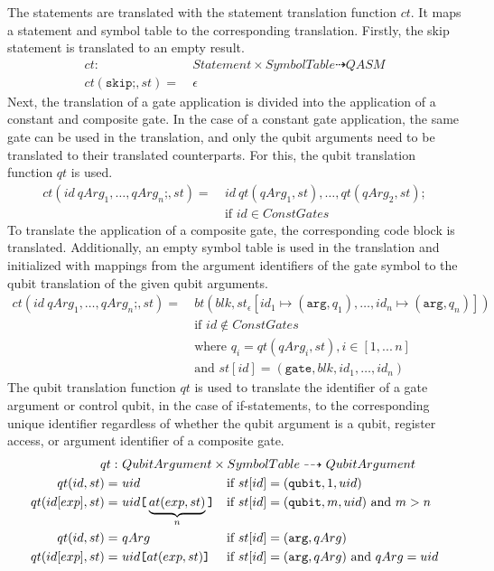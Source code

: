 The statements are translated with the statement translation function $ct$. It maps a statement and symbol table to the corresponding translation. Firstly, the skip statement is translated to an empty result.
\begin{align*}
    ct : \ & Statement \times SymbolTable \dashrightarrow QASM\\
    ct(\texttt{skip;}, st) = \ & \epsilon
\end{align*}
Next, the translation of a gate application is divided into the application of a constant and composite gate. In the case of a constant gate application, the same gate can be used in the translation, and only the qubit arguments need to be translated to their translated counterparts. For this, the qubit translation function $qt$ is used.
\begin{align*}
    ct(id \ qArg_1, \dots, qArg_n\texttt{;}, st) = \ & id \ qt(qArg_1, st), \dots, qt(qArg_2, st); \\
                                                       & \text{if } id \in ConstGates
\end{align*}
To translate the application of a composite gate, the corresponding code block is translated. Additionally, an empty symbol table is used in the translation and initialized with mappings from the argument identifiers of the gate symbol to the qubit translation of the given qubit arguments.
\begin{align*}
    ct(id \ qArg_1, \dots, qArg_n\texttt{;}, st) = \ & bt(blk, st_\epsilon[id_1 \mapsto (\texttt{arg}, q_1), \dots, id_n \mapsto (\texttt{arg}, q_n)]) \\
        &\text{if } id \not\in ConstGates\\
        &\text{where } q_i = qt(qArg_i, st), i \in [1, ...\, n]\\
        &\text{and } st[id] = (\texttt{gate}, blk, id_1, \dots, id_n)
\end{align*}
The qubit translation function $qt$ is used to translate the identifier of a gate argument or control qubit, in the case of if-statements, to the corresponding unique identifier regardless of whether the qubit argument is a qubit, register access, or argument identifier of a composite gate.
\begin{align*}
    qt :\ & \rlap{$QubitArgument \times SymbolTable \dashrightarrow QubitArgument$} &&\\
    qt(id, st) = \ & uid  && \text{if } st[id] = (\texttt{qubit}, 1, uid)\\
    qt(id[exp], st) = \ & uid\texttt{[}\underbrace{at(exp, st)}_{n}\texttt{]} && \text{if } st[id] = (\texttt{qubit}, m, uid) \text{ and } m > n\\
    qt(id, st) = \ & qArg  && \text{if } st[id] = (\texttt{arg}, qArg)\\
    qt(id[exp], st) = \ & uid\texttt{[}at(exp, st)\texttt{]} && \text{if } st[id] = (\texttt{arg}, qArg) \text{ and } qArg = uid
\end{align*}

